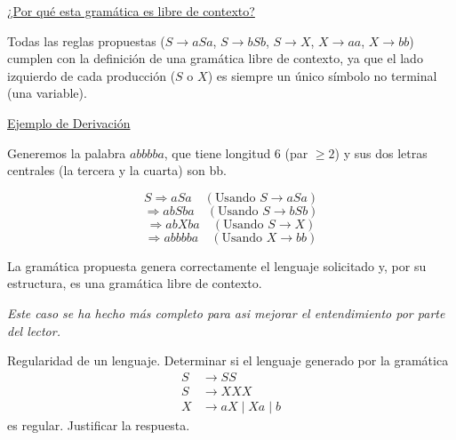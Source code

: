 \documentclass[12pt]{book} %
\begin{document}
\begin{ejercicio}
\begin{enumerate}[label=\alph*)]
\begin{solucion}
    \underline{¿Por qué esta gramática es libre de contexto?}

    Todas las reglas propuestas (\( S \to aSa \), \( S \to bSb \), \( S \to X \), \( X \to aa \), \( X \to bb \)) cumplen con la definición de una gramática libre de contexto, ya que el lado izquierdo de cada producción (\( S \) o \( X \)) es siempre un único símbolo no terminal (una variable).

    \underline{Ejemplo de Derivación}

    Generemos la palabra \( abbbba \), que tiene longitud 6 (par \( \geq 2 \)) y sus dos letras centrales (la tercera y la cuarta) son bb.

    \[
    S \Rightarrow aSa \quad (\text{Usando } S \to aSa)
    \]
    \[
    \Rightarrow abSba \quad (\text{Usando } S \to bSb)
    \]
    \[
    \Rightarrow abXba \quad (\text{Usando } S \to X)
    \]
    \[
    \Rightarrow abbbba \quad (\text{Usando } X \to bb)
    \]

    La gramática propuesta genera correctamente el lenguaje solicitado y, por su estructura, es una gramática libre de contexto.

    \textit{Este caso se ha hecho más completo para asi mejorar el entendimiento por parte del lector.}
    \end{solucion}


\end{enumerate}

\end{ejercicio}

\begin{ejercicio}
Regularidad de un lenguaje.
Determinar si el lenguaje generado por la gramática  
\begin{align*}
S &\to SS \\
S &\to XXX \\
X &\to aX \mid Xa \mid b
\end{align*}
es regular. Justificar la respuesta.
\end{ejercicio}
\end{document}
